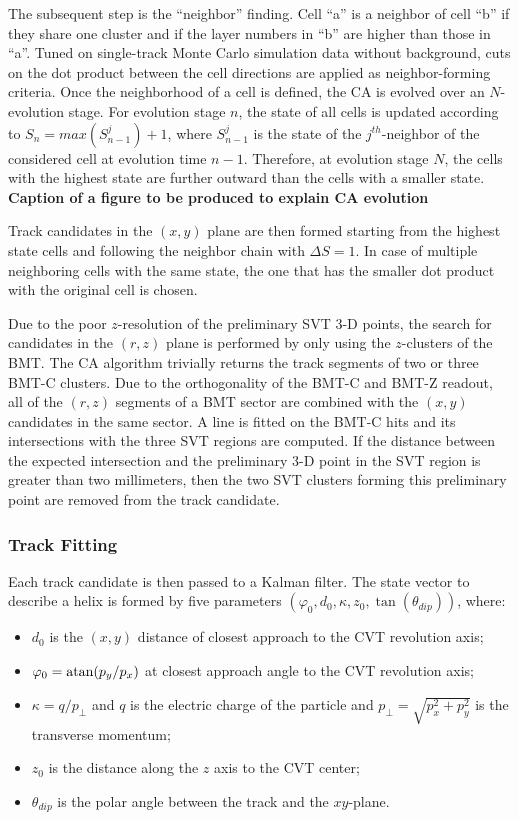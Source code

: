 The subsequent step is the ``neighbor'' finding. Cell ``a'' is a neighbor of cell ``b'' if they share one cluster and
if the layer numbers in ``b'' are higher than those in ``a''. Tuned on single-track Monte Carlo simulation data
without background, cuts on the dot product between the cell directions are applied as neighbor-forming criteria.
Once the neighborhood of a cell is defined, the CA is evolved over an $N$-evolution stage. For evolution stage $n$,
the state of all cells is updated according to $S_n = max(S_{n-1}^j) + 1$, where $S_{n-1}^j$ is the state of the
$j^{th}$-neighbor of the considered cell at evolution time $n-1$. Therefore, at evolution stage $N$, the cells with
the highest state are further outward than the cells with a smaller state. \color{red} \textbf{Caption of a figure
  to be produced to explain CA evolution} \color{black}

Track candidates in the $(x,y)$ plane are then formed starting from the highest state cells and following the
neighbor chain with $\Delta S = 1$. In case of multiple neighboring cells with the same state, the one that has
the smaller dot product with the original cell is chosen.

Due to the poor $z$-resolution of the preliminary SVT 3-D points, the search for candidates in the $(r,z)$ plane is
performed by only using the $z$-clusters of the BMT. The CA algorithm trivially returns the track segments of two
or three BMT-C clusters. Due to the orthogonality of the BMT-C and BMT-Z readout, all of the $(r,z)$ segments of
a BMT sector are combined with the $(x,y)$ candidates in the same sector. A line is fitted on the BMT-C hits and
its intersections with the three SVT regions are computed. If the distance between the expected intersection and
the preliminary 3-D point in the SVT region is greater than two millimeters, then the two SVT clusters forming this
preliminary point are removed from the track candidate.

\subsubsection{Track Fitting}

Each track candidate is then passed to a Kalman filter. The state vector to describe a helix is formed by five
parameters $(\varphi_0, d_0, \kappa, z_0, \tan(\theta_{dip}))$, where:

\begin{itemize}
\item $d_0$ is the $(x,y)$ distance of closest approach to the CVT revolution axis;
\item $\varphi_0 = {\rm atan}(p_y/p_x)$ at closest approach angle to the CVT revolution axis;
\item $\kappa=q/p_\perp$ and $q$ is the electric charge of the particle and $p_\perp=\sqrt{p_x^2+p_y^2}$ is
  the transverse momentum;
\item $z_0$ is the distance along the $z$ axis to the CVT center;
\item $\theta_{dip}$ is the polar angle between the track and the $xy$-plane.
\end{itemize}

